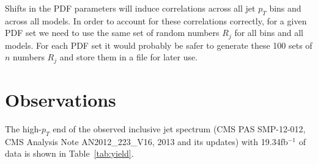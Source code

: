 \documentclass[aps,prd,preprint,nofootinbib]{revtex4}
\begin{document}
Shifts in the PDF parameters will induce correlations across all jet $p_T$ bins and across all models. In order
to account for these correlations correctly, for a given PDF set we need to use the same set of random numbers $R_j$ for all bins and all models. For each PDF set it would probably be safer to generate these 100 sets of $n$ numbers $R_j$ and store them in a file for later use.


\bigskip

\section{Observations}
The high-$p_T$ end of the observed inclusive jet spectrum (CMS PAS SMP-12-012, CMS Analysis Note AN2012\_223\_V16, 2013 and its updates) with 19.34fb$^{-1}$ of data is shown in Table~\ref{tab:yield}.
%

\end{document}

